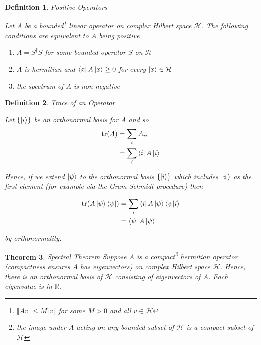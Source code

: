 \documentclass[11pt]{article}
\newcommand\0{\mathbf{0}}
\newcommand\RR{\mathbb{R}}
\newcommand\<{\langle}
\renewcommand\>{\rangle}
\newtheorem{theorem}{Theorem}[section]
\newtheorem{definition}[theorem]{Definition}
\begin{document}
\begin{definition}
\label{posop}
Positive Operators

Let $A$ be a bounded\footnote{$\Vert Av \Vert \leq M\Vert v \Vert$ for some $M>0$ and all $v \in \mathcal{H}$} linear operator on complex Hilbert space $\mathcal{H}$. The following conditions are equivalent to $A$ being positive

\begin{enumerate}
\item $A=S^\dag S$ for some bounded operator $S$ on $\mathcal{H}$
\item $A$ is hermitian and $\bra{x} A \ket{x} \geq 0$ for every $\ket{x} \in \mathcal{H}$
\item the spectrum of $A$ is non-negative
\end{enumerate}
\end{definition}

\begin{definition}
\label{trop}
Trace of an Operator

Let $\{\ket{i}\}$ be an orthonormal basis for $A$ and so
\begin{align*}
\tr(A) &= \sum_i A_{ii} \\
&= \sum_i \bra{i} A \ket{i}	
\end{align*}

Hence, if we extend $\ket{\psi}$ to the orthonormal basis $\{\ket{i}\}$ which includes $\ket{\psi}$ as the first element (for example via the Gram-Schmidt procedure) then

\begin{align*}
	\tr(A\ket{\psi}\bra{\psi}) &= \sum_i \bra{i} A\ket{\psi}\bra{\psi}\ket{i}	 \\
	&= \bra{\psi} A\ket{\psi}
\end{align*}

by orthonormality.
\end{definition}

\begin{theorem}Spectral Theorem
\label{thm:spec}
Suppose $A$ is a compact\footnote{the image under $A$ acting on any bounded subset of $\mathcal{H}$ is a compact subset of $\mathcal{H}$} hermitian operator (compactness ensures $A$ has eigenvectors) on complex Hilbert space $\mathcal{H}$. Hence, there is an orthonormal basis of $\mathcal{H}$ consisting of eigenvectors of $A$. Each eigenvalue is in $\RR$.	
\end{theorem}
\end{document}
